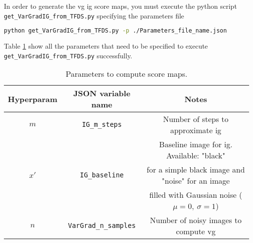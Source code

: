 
In order to generate the \acrlong{vg} \acrlong{ig} score maps, you must execute the python script \texttt{get\_VarGradIG\_from\_TFDS.py} specifying the parameters file
\begin{lstlisting}[language=Bash]
python get_VarGradIG_from_TFDS.py -p ./Parameters_file_name.json
\end{lstlisting}

Table \ref{table:imp_notes:VGIG_params} show all the parameters that need to be specified to execute \texttt{get\_VarGradIG\_from\_TFDS.py} successfully.

\begin{table}[!ht]
  \centering
  \begin{tabular}{c|c|c}
    Hyperparam & JSON variable name & Notes \\
    \hline
    $m$ & \texttt{IG\_m\_steps} & Number of steps to approximate \gls{ig} \\
    \hline
     &  & Baseline image for \gls{ig}. Available: "black" \\
    $x'$ &  \texttt{IG\_baseline} & for a simple black image and "noise" for an image \\
     &  &  filled with Gaussian noise ($\mu=0,\ \sigma=1$) \\
    \hline
    $n$ & \texttt{VarGrad\_n\_samples} & Number of noisy images to compute \gls{vg} \\
    \hline
  \end{tabular}
  \caption{Parameters to compute score maps.}
  \label{table:imp_notes:VGIG_params}
\end{table}
